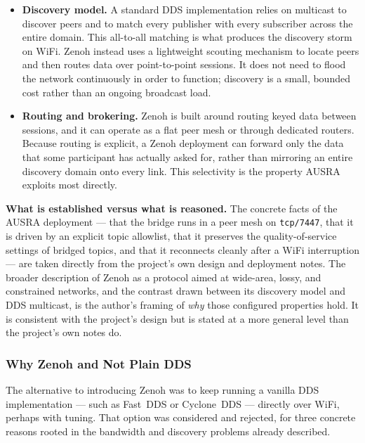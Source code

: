 \begin{itemize}
    \item \textbf{Discovery model.} A standard DDS implementation relies on multicast to discover peers and to match every publisher with every subscriber across the entire domain. This all-to-all matching is what produces the discovery storm on WiFi. Zenoh instead uses a lightweight scouting mechanism to locate peers and then routes data over point-to-point sessions. It does not need to flood the network continuously in order to function; discovery is a small, bounded cost rather than an ongoing broadcast load.
    \item \textbf{Routing and brokering.} Zenoh is built around routing keyed data between sessions, and it can operate as a flat peer mesh or through dedicated routers. Because routing is explicit, a Zenoh deployment can forward only the data that some participant has actually asked for, rather than mirroring an entire discovery domain onto every link. This selectivity is the property AUSRA exploits most directly.
\end{itemize}

\begin{notebox}
\textbf{What is established versus what is reasoned.} The concrete facts of the AUSRA deployment --- that the bridge runs in a peer mesh on \texttt{tcp/7447}, that it is driven by an explicit topic allowlist, that it preserves the quality-of-service settings of bridged topics, and that it reconnects cleanly after a WiFi interruption --- are taken directly from the project's own design and deployment notes. The broader description of Zenoh as a protocol aimed at wide-area, lossy, and constrained networks, and the contrast drawn between its discovery model and DDS multicast, is the author's framing of \emph{why} those configured properties hold. It is consistent with the project's design but is stated at a more general level than the project's own notes do.
\end{notebox}

\subsubsection{Why Zenoh and Not Plain DDS}
\label{subsubsec:why_zenoh}

The alternative to introducing Zenoh was to keep running a vanilla DDS implementation --- such as Fast~DDS or Cyclone~DDS --- directly over WiFi, perhaps with tuning. That option was considered and rejected, for three concrete reasons rooted in the bandwidth and discovery problems already described.


